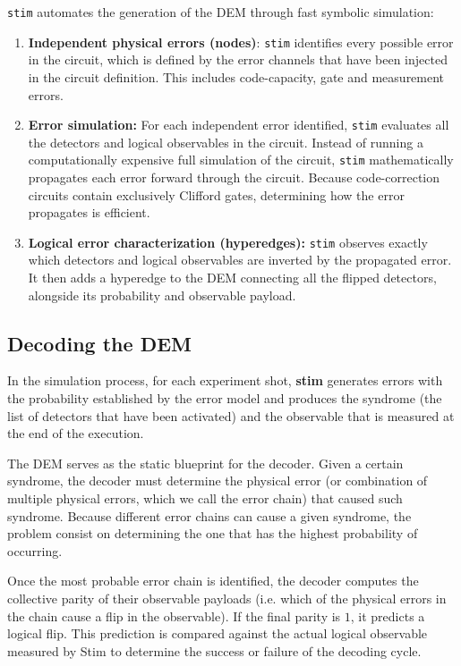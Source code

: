 \texttt{stim} automates the generation of the DEM through fast symbolic simulation:
\begin{enumerate}
    \item \textbf{Independent physical errors (nodes)}: \texttt{stim} identifies every possible error in the circuit, which is defined by the error channels that have been injected in the circuit definition. This includes code-capacity, gate and measurement errors.
    \item \textbf{Error simulation:} For each independent error identified, \texttt{stim} evaluates all the detectors and logical observables in the circuit. Instead of running a computationally expensive full simulation of the circuit, \texttt{stim} mathematically propagates each error forward through the circuit. Because code-correction circuits contain exclusively Clifford gates, determining how the error propagates is efficient.
    \item \textbf{Logical error characterization (hyperedges):} \texttt{stim} observes exactly which detectors and logical observables are inverted by the propagated error. It then adds a hyperedge to the DEM connecting all the flipped detectors, alongside its probability and observable payload.
\end{enumerate}


\subsection{Decoding the DEM}
In the simulation process, for each experiment shot, \textbf{stim} generates errors with the probability established by the error model and produces the syndrome (the list of detectors that have been activated) and the observable that is measured at the end of the execution.

The DEM serves as the static blueprint for the decoder. Given a certain syndrome, the decoder must determine the physical error (or combination of multiple physical errors, which we call the error chain) that caused such syndrome. Because different error chains can cause a given syndrome, the problem consist on determining the one that has the highest probability of occurring. 

Once the most probable error chain is identified, the decoder computes the collective parity of their observable payloads (i.e. which of the physical errors in the chain cause a flip in the observable). If the final parity is $1$, it predicts a logical flip. This prediction is compared against the actual logical observable measured by Stim to determine the success or failure of the decoding cycle.



